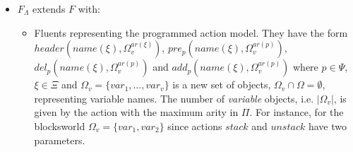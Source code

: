\documentclass[letterpaper]{article} %
\begin{document}
\begin{itemize}
\item $F_{\Lambda}$ extends $F$ with:
\begin{itemize}
\item Fluents representing the programmed action model. They have the form $header(name(\xi),\Omega_v^{ar(\xi)})$, $pre_p(name(\xi),\Omega_v^{ar(p)})$, $del_p(name(\xi),\Omega_v^{ar(p)})$ and $add_p(name(\xi),\Omega_v^{ar(p)})$ where $p\in \Psi$, $\xi\in\Xi$ and $\Omega_v=\{var_1,\ldots,var_v\}$ is a new set of objects, $\Omega_v\cap\Omega=\emptyset$, representing variable names. The number of {\em variable} objects, i.e. $|\Omega_v|$, is given by the action with the maximum arity in $\Pi$. For instance, for the blocksworld $\Omega_v=\{var_1,var_2\}$ since actions $stack$ and $unstack$ have two parameters.


\end{itemize}
\end{itemize}
\end{document}
